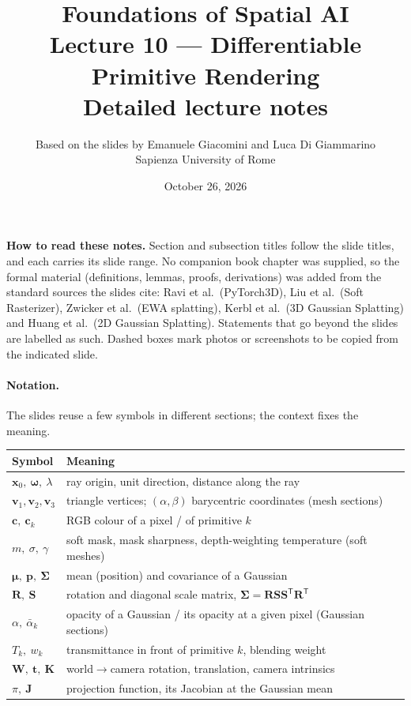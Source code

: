 \documentclass[11pt,a4paper]{article}
\title{\textbf{Foundations of Spatial AI}\\[3pt]
Lecture 10 --- Differentiable Primitive Rendering\\[6pt]\large Detailed lecture notes}
\author{Based on the slides by Emanuele Giacomini and Luca Di Giammarino\\ Sapienza University of Rome}
\date{October 26, 2026}
\newcommand{\T}{^{\mathsf T}}
\newcommand{\abar}{\bar\alpha}
\theoremstyle{definition}
\theoremstyle{algstyle}
\theoremstyle{plain}
\theoremstyle{remark}
\begin{document}
\maketitle
\tableofcontents

\bigskip
\begin{tcolorbox}[colback=gray!5,colframe=gray!50,boxrule=0.4pt,arc=2pt]
\textbf{How to read these notes.} Section and subsection titles follow the slide titles, and each carries its slide range. No companion book chapter was supplied, so the formal material (definitions, lemmas, proofs, derivations) was added from the standard sources the slides cite: Ravi et al.\ (PyTorch3D), Liu et al.\ (Soft Rasterizer), Zwicker et al.\ (EWA splatting), Kerbl et al.\ (3D Gaussian Splatting) and Huang et al.\ (2D Gaussian Splatting). Statements that go beyond the slides are labelled as such. Dashed boxes mark photos or screenshots to be copied from the indicated slide.
\end{tcolorbox}

\paragraph{Notation.} The slides reuse a few symbols in different sections; the context fixes the meaning.
\begin{center}
\small
\begin{tabular}{@{}p{3.6cm}p{11.3cm}@{}}
\toprule
Symbol & Meaning \\ \midrule
$\bm x_0,\ \bm\omega,\ \lambda$ & ray origin, unit direction, distance along the ray \\
$\bm v_1,\bm v_2,\bm v_3$ & triangle vertices; $(\alpha,\beta)$ barycentric coordinates (mesh sections) \\
$\bm c,\ \bm c_k$ & RGB colour of a pixel / of primitive $k$ \\
$m,\ \sigma,\ \gamma$ & soft mask, mask sharpness, depth-weighting temperature (soft meshes) \\
$\bm\mu,\ \bm p,\ \bm\Sigma$ & mean (position) and covariance of a Gaussian \\
$\bm R,\ \bm S$ & rotation and diagonal scale matrix, $\bm\Sigma=\bm R\bm S\bm S\T\bm R\T$ \\
$\alpha,\ \abar_k$ & opacity of a Gaussian / its opacity at a given pixel (Gaussian sections) \\
$T_k,\ w_k$ & transmittance in front of primitive $k$, blending weight \\
$\bm W,\ \bm t,\ \bm K$ & world$\to$camera rotation, translation, camera intrinsics \\
$\pi,\ \bm J$ & projection function, its Jacobian at the Gaussian mean \\
\bottomrule
\end{tabular}
\end{center}
\newpage
\end{document}
